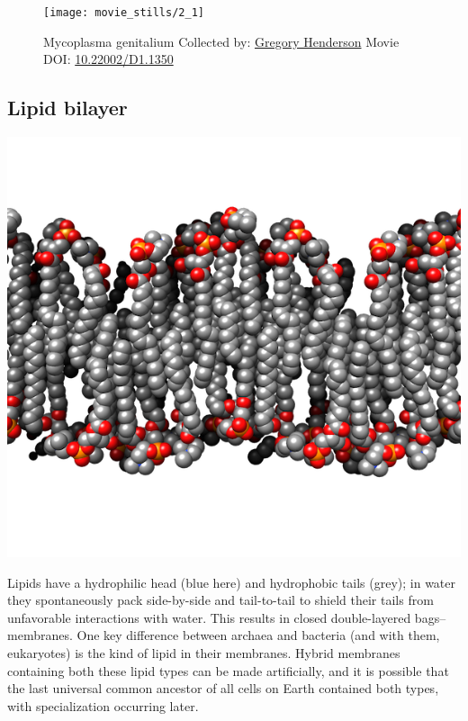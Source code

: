 \documentclass[]{tufte-book}
\begin{document}
\begin{figure}
\texttt{[image: movie\_stills/2\_1]} \caption[Mycoplasma genitalium Collected by:
\protect\hyperlink{gregory_henderson}{Gregory Henderson} Movie DOI:
\href{https://doi.org/10.22002/D1.1350}{10.22002/D1.1350}]{Mycoplasma genitalium Collected by:
\protect\hyperlink{gregory_henderson}{Gregory Henderson} Movie DOI:
\href{https://doi.org/10.22002/D1.1350}{10.22002/D1.1350}}\label{fig:2-1}
\end{figure}

\subsection{Lipid bilayer}\label{Lipid_bilayer}

\includegraphics{img/schematics/2_1_1}

Lipids have a hydrophilic head (blue here) and hydrophobic tails (grey);
in water they spontaneously pack side-by-side and tail-to-tail to shield
their tails from unfavorable interactions with water. This results in
closed double-layered bags--membranes. One key difference between
archaea and bacteria (and with them, eukaryotes) is the kind of lipid in
their membranes. Hybrid membranes containing both these lipid types can
be made artificially, and it is possible that the last universal common
ancestor of all cells on Earth contained both types, with specialization
occurring later.
\end{document}
